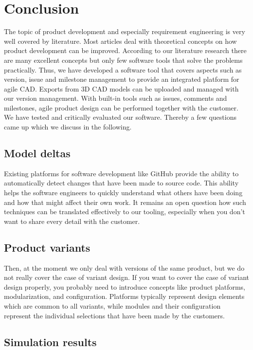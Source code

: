 \section{Conclusion}
\label{sec:conclusion}

The topic of product development and especially requirement engineering is very well covered by literature.
Most articles deal with theoretical concepts on how product development can be improved.
According to our literature research there are many excellent concepts but only few software tools that solve the problems practically.
Thus, we have developed a software tool that covers aspects such as version, issue and milestone management to provide an integrated platform for agile CAD.
Exports from 3D CAD models can be uploaded and managed with our version management.
With built-in tools such as issues, comments and milestones, agile product design can be performed together with the customer.
We have tested and critically evaluated our software.
Thereby a few questions came up which we discuss in the following.

\subsection{Model deltas}

Existing platforms for software development like GitHub provide the ability to automatically detect changes that have been made to source code.
This ability helps the software engineers to quickly understand what others have been doing and how that might affect their own work.
It remains an open question how such techniques can be translated effectively to our tooling, especially when you don't want to share every detail with the customer.

\subsection{Product variants}

Then, at the moment we only deal with versions of the same product, but we do not really cover the case of variant design.
If you want to cover the case of variant design properly, you probably need to introduce concepts like product platforms, modularization, and configuration.
Platforms typically represent design elements which are common to all variants, while modules and their configuration represent the individual selections that have been made by the customers.

\subsection{Simulation results}

